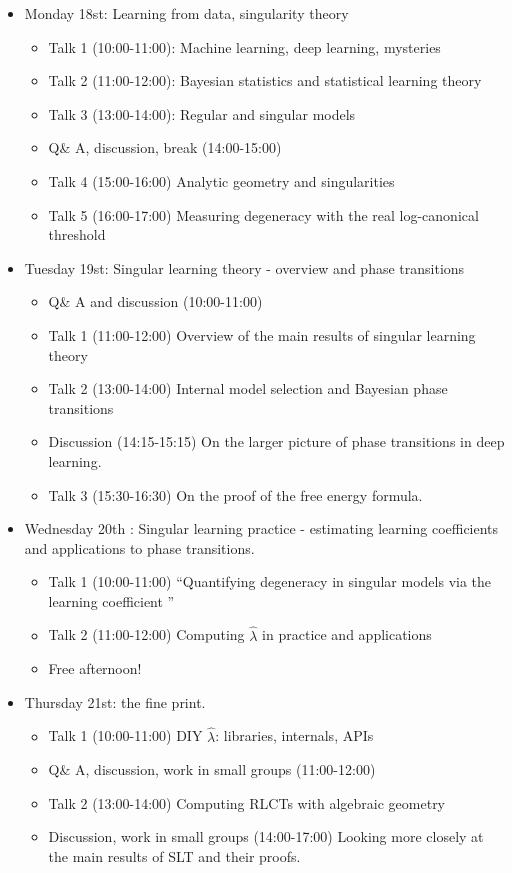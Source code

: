 \documentclass[a4paper,11pt]{amsart}
\newcommand{\lambdahat}{\widehat{\lambda}}
\begin{document}
\begin{itemize}
\item Monday 18st: Learning from data, singularity theory
  \begin{itemize}
  \item Talk 1 (10:00-11:00): Machine learning, deep learning, mysteries
  \item Talk 2 (11:00-12:00): Bayesian statistics and statistical learning theory
  \item Talk 3 (13:00-14:00): Regular and singular models
  \item Q\& A, discussion, break (14:00-15:00)
  \item Talk 4 (15:00-16:00) Analytic geometry and singularities
  \item Talk 5 (16:00-17:00) Measuring degeneracy with the real log-canonical threshold  
  \end{itemize}
\item Tuesday 19st: Singular learning theory - overview and phase transitions
  \begin{itemize}
  \item Q\& A and discussion (10:00-11:00)
  \item Talk 1 (11:00-12:00) Overview of the main results of singular learning theory
  \item Talk 2 (13:00-14:00) Internal model selection and Bayesian phase transitions
  \item Discussion (14:15-15:15) On the larger picture of phase transitions in deep learning.
  \item Talk 3 (15:30-16:30) On the proof of the free energy formula.
  \end{itemize}
\item Wednesday 20th : Singular learning practice - estimating learning coefficients and applications to phase transitions.
  \begin{itemize}
  \item Talk 1 (10:00-11:00) ``Quantifying degeneracy in singular models via the learning coefficient ''
  \item Talk 2 (11:00-12:00) Computing $\lambdahat$ in practice and applications
\item Free afternoon!
  \end{itemize}
\item Thursday 21st: the fine print.
  \begin{itemize}
  \item Talk 1 (10:00-11:00) DIY $\lambdahat$: libraries, internals, APIs
\item Q\& A, discussion, work in small groups (11:00-12:00)
  \item Talk 2 (13:00-14:00) Computing RLCTs with algebraic geometry
\item Discussion, work in small groups (14:00-17:00) Looking more closely at the main results of SLT and their proofs.
  \end{itemize}
\end{itemize}
\end{document}
